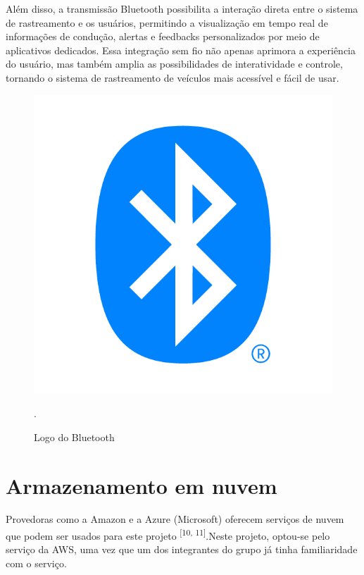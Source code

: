 Além disso, a transmissão Bluetooth possibilita a interação direta entre o sistema de rastreamento e os usuários, permitindo a visualização em tempo real de informações de condução, alertas e feedbacks personalizados por meio de aplicativos dedicados. Essa integração sem fio não apenas aprimora a experiência do usuário, mas também amplia as possibilidades de interatividade e controle, tornando o sistema de rastreamento de veículos mais acessível e fácil de usar.

 \begin{figure}[hp]
    \centering
    
    \includegraphics[scale=0.4]{figures/bluetooth.png}
    
    \caption{Logo do Bluetooth}.
    
\end{figure}

\section{Armazenamento em nuvem}
Provedoras como a Amazon e a Azure (Microsoft) oferecem serviços de nuvem que podem ser usados para este projeto \textsuperscript{[10, 11]}.Neste projeto, optou-se pelo serviço da AWS, uma vez que um dos integrantes do grupo já tinha familiaridade com o serviço.

